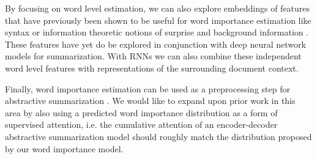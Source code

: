 By focusing on word level estimation, we can also explore embeddings
of features that have previously been shown to be useful for word importance
estimation like syntax \citep{rose2005relative} or information theoretic notions of surprise and 
background information 
\citep{lin2000automated,hong2014improving,louis2014bayesian}. These features
have yet do be explored in conjunction with deep neural network models
for summarization. With RNNs we can also combine these independent word
level features with representations of the surrounding document context.

Finally, word importance estimation can be used as a preprocessing 
step for abstractive summarization \citep{gehrmann2018bottom}. We would
like to expand upon prior work in this area by also using a predicted
word importance distribution as a form of supervised attention, i.e.
the cumulative attention of an encoder-decoder abstractive 
summarization model should roughly match the distribution proposed by our word
importance model.



